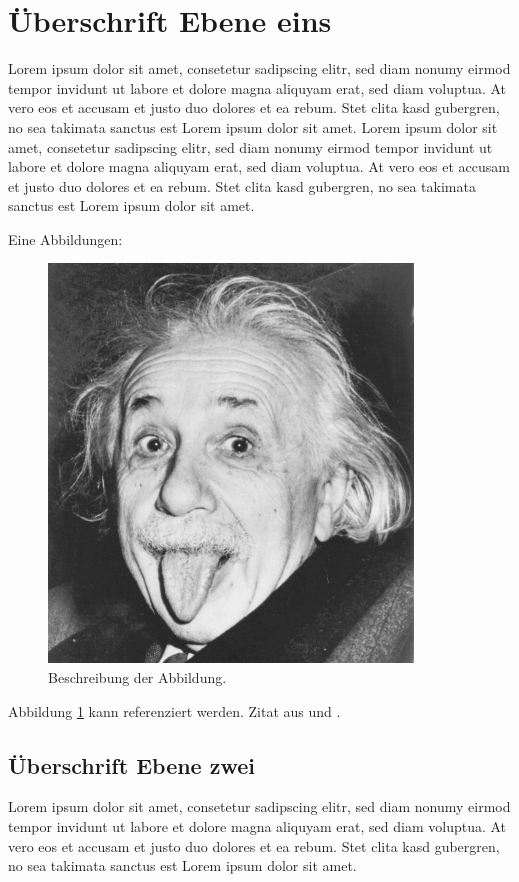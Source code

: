 \section{Überschrift Ebene eins}

Lorem ipsum dolor sit amet, consetetur sadipscing elitr, sed diam nonumy eirmod tempor invidunt ut labore et dolore magna aliquyam erat, sed diam voluptua. At vero eos et accusam et justo duo dolores et ea rebum. Stet clita kasd gubergren, no sea takimata sanctus est Lorem ipsum dolor sit amet. Lorem ipsum dolor sit amet, consetetur sadipscing elitr, sed diam nonumy eirmod tempor invidunt ut labore et dolore magna aliquyam erat, sed diam voluptua. At vero eos et accusam et justo duo dolores et ea rebum. Stet clita kasd gubergren, no sea takimata sanctus est Lorem ipsum dolor sit amet.

Eine Abbildungen:

\begin{figure}[hb!]
\centering
\includegraphics[scale=0.5]{einstein}
\caption{Beschreibung der Abbildung.}
\label{abb_einstein}
\end{figure}

Abbildung \ref{abb_einstein} kann referenziert werden. Zitat aus \cite{scheme} und \cite[S. 17]{knuth}.

\subsection{Überschrift Ebene zwei}

Lorem ipsum dolor sit amet, consetetur sadipscing elitr, sed diam nonumy eirmod tempor invidunt ut labore et dolore magna aliquyam erat, sed diam voluptua. At vero eos et accusam et justo duo dolores et ea rebum. Stet clita kasd gubergren, no sea takimata sanctus est Lorem ipsum dolor sit amet.

